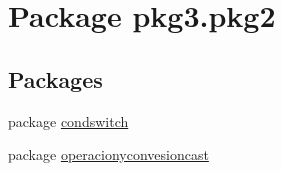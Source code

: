 \hypertarget{namespacepkg3_1_1pkg2}{}\section{Package pkg3.\+pkg2}
\label{namespacepkg3_1_1pkg2}
\subsection*{Packages}
\begin{DoxyCompactItemize}
\item 
package \mbox{\hyperlink{namespacepkg3_1_1pkg2_1_1condswitch}{condswitch}}
\item 
package \mbox{\hyperlink{namespacepkg3_1_1pkg2_1_1operacionyconvesioncast}{operacionyconvesioncast}}
\end{DoxyCompactItemize}
